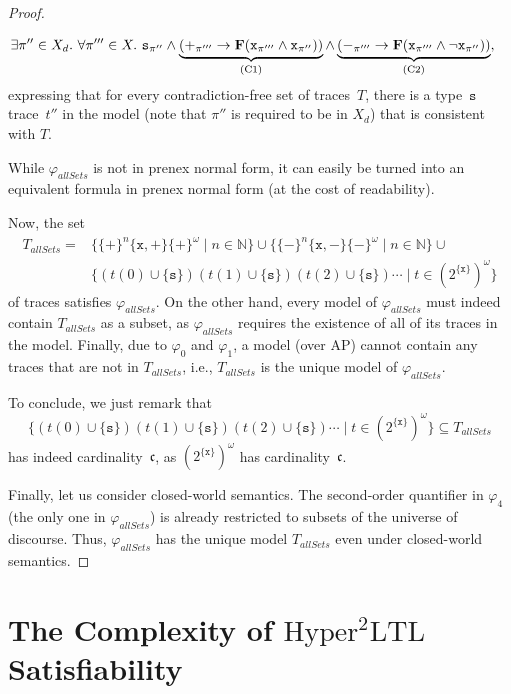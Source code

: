 \documentclass[dvipsnames,10pt,a4paper]{amsart}
\theoremstyle{definition}
\theoremstyle{remark}
\newcommand{\nats}{\mathbb{N}}
\renewcommand{\phi}{\varphi}
\newcommand{\pow}[1]{2^{#1}}
\newcommand{\set}[1]{\{#1\}}
\newcommand{\F}{\mathop{\mathbf{F}\vphantom{a}}\nolimits}
\newcommand{\sohyltl}{\mathrm{Hyper^2LTL}\xspace}
\newcommand{\ap}[0]{\mathrm{AP}}
\newcommand{\unidisvar}{X_d}
\newcommand{\posprop}{\mathtt{+}}
\newcommand{\negprop}{\mathtt{-}}
\newcommand{\setprop}{\mathtt{s}}
\newcommand{\inprop}{\mathtt{x}}
\newcommand{\contcard}{\mathfrak{c}}
\newcommand{\allsets}{{\mathit{allSets}}}
\begin{document}
\begin{proof}
\begin{itemize}
\begin{align*}
&{}\exists \pi'' \in \unidisvar.\ \forall \pi''' \in X.\ \setprop_{\pi''} \wedge  \underbrace{(\posprop_{\pi'''} \rightarrow \F(\inprop_{\pi'''} \wedge \inprop_{\pi''}))}_{\text{(C1)}}
\wedge 
\underbrace{(\negprop_{\pi'''} \rightarrow \F(\inprop_{\pi'''} \wedge \neg\inprop_{\pi''}))}_{\text{(C2)}},
\end{align*} 
expressing that for every contradiction-free set of traces~$T$, there is a type~$\setprop$ trace~$t''$ in the model (note that $\pi''$ is required to be in $\unidisvar$) that is consistent with $T$. 
\end{itemize}
While $\phi_\allsets$ is not in prenex normal form, it can easily be turned into an equivalent formula in prenex normal form (at the cost of readability).

Now, the set 
\begin{align*}
T_\allsets ={}&{} \set{\set{\posprop}^n \set{\inprop,\posprop} \set{\posprop}^\omega \mid n\in\nats} \cup \set{\set{\negprop}^n \set{\inprop,\negprop} \set{\negprop}^\omega \mid n\in\nats} \cup\\
&{}\set{ (t(0) \cup \set{\setprop})(t(1) \cup \set{\setprop})(t(2) \cup \set{\setprop}) \cdots \mid t \in (\pow{\set{\inprop}})^\omega} 
\end{align*}
of traces satisfies $\phi_\allsets$.
On the other hand, every model of $\phi_\allsets$ must indeed contain $T_\allsets$ as a subset, as $\phi_\allsets$ requires the existence of all of its traces in the model.
Finally, due to $\phi_0$ and $\phi_1$, a model (over $\ap$) cannot contain any traces that are not in $T_\allsets$,
i.e., $T_\allsets$ is the unique model of $\phi_\allsets$.

To conclude, we just remark that 
\[\set{ (t(0) \cup \set{\setprop})(t(1) \cup \set{\setprop})(t(2) \cup \set{\setprop}) \cdots \mid t \in (\pow{\set{\inprop}})^\omega} \subseteq T_\allsets\] has indeed cardinality~$\contcard$, as
$(\pow{\set{\inprop}})^\omega$ has cardinality~$\contcard$.

Finally, let us consider closed-world semantics. The second-order quantifier in $\phi_4$ (the only one in $\phi_\allsets$) is already restricted to subsets of the universe of discourse.
Thus, $\phi_\allsets$ has the unique model $T_\allsets$ even under closed-world semantics.
\end{proof}


\section{\texorpdfstring{The Complexity of $\sohyltl$ Satisfiability}{The Complexity of Second-order HyperLTL Satisfiability}}
\label{sec_sat}
\end{document}
